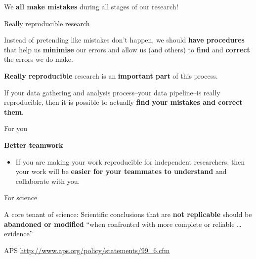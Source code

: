 \documentclass[10pt]{beamer}
\begin{document}
\begin{frame}

    \begin{center}
        {\LARGE{We \textbf{all make mistakes} during all stages of our research!}}

    \end{center}

\end{frame}

\begin{frame}{Really reproducible research}

    Instead of pretending like mistakes don't happen, we should \textbf{have procedures} that help us \textbf{minimise} our errors and allow us (and others) to \textbf{find} and \textbf{correct} the errors we do make.

    \vspace{1cm}

    \textbf{Really reproducible} research is an \textbf{important part} of this process.

\end{frame}

\begin{frame}

    If your data gathering and analysis process--your \alert{data pipeline}--is really reproducible, then it is possible to actually \textbf{find your mistakes and correct them}.

\end{frame}

\begin{frame}{For you}

    \textbf{Better teamwork}

    \begin{itemize}

            \item If you are making your work reproducible for independent researchers, then your work will be \textbf{easier for your teammates to understand} and collaborate with you.

    \end{itemize}

\end{frame}

\begin{frame}{For science}

    A \alert{core tenant} of science: Scientific conclusions that are \textbf{not replicable} should be \textbf{abandoned or modified} ``when confronted with more complete or reliable \ldots evidence''

{\tiny{APS \url{http://www.aps.org/policy/statements/99_6.cfm}}}

\end{frame}
\end{document}
